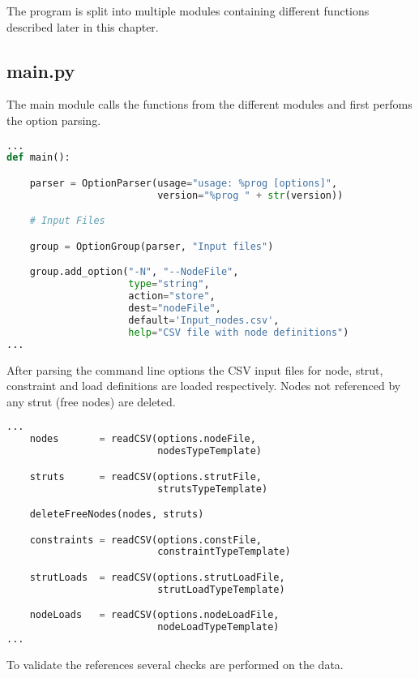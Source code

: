 The program is split into multiple modules containing different functions described later in this chapter.

\subsection{main.py}
\label{subsec:main.py}

The main module calls the functions from the different modules and first perfoms the option parsing.


\begin{lstlisting}[basicstyle=\small,language=python]
...
def main():

    parser = OptionParser(usage="usage: %prog [options]",
                          version="%prog " + str(version))

    # Input Files                                       

    group = OptionGroup(parser, "Input files")

    group.add_option("-N", "--NodeFile",
                     type="string",
                     action="store",
                     dest="nodeFile",
                     default='Input_nodes.csv',
                     help="CSV file with node definitions")
...
\end{lstlisting}

After parsing the command line options the CSV input files for node, strut, constraint and load definitions are loaded respectively.
Nodes not referenced by any strut (free nodes) are deleted.

\begin{lstlisting}[basicstyle=\small,language=python]
...
    nodes       = readCSV(options.nodeFile,
                          nodesTypeTemplate)

    struts      = readCSV(options.strutFile,
                          strutsTypeTemplate)

    deleteFreeNodes(nodes, struts)

    constraints = readCSV(options.constFile,
                          constraintTypeTemplate)

    strutLoads  = readCSV(options.strutLoadFile,
                          strutLoadTypeTemplate)

    nodeLoads   = readCSV(options.nodeLoadFile,
                          nodeLoadTypeTemplate)
...
\end{lstlisting}

\pagebreak

To validate the references several checks are performed on the data.


